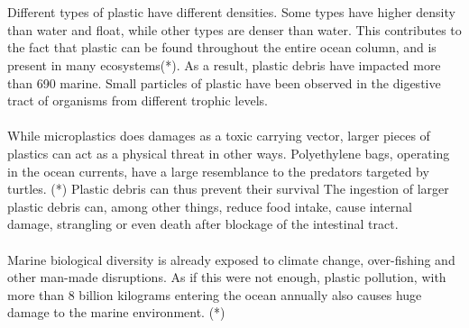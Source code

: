 \\\\
Different types of plastic have different densities. Some types have higher density than water and float, while other types are denser than water. This contributes to the fact that plastic can be found throughout the entire ocean column, and is present in many ecosystems(*). As a result, plastic debris have impacted more than 690 marine. Small particles of plastic have been observed in the digestive tract of organisms from different trophic levels. 
\\\\
While microplastics does damages as a toxic carrying vector, larger pieces of plastics can act as a physical threat in other ways. Polyethylene bags, operating in the ocean currents, have a large resemblance to the predators targeted by turtles. (*) Plastic debris can thus prevent their survival %
The ingestion of larger plastic debris can, among other things, reduce food intake, cause internal damage, strangling or even death after blockage of the intestinal tract. %
\\\\
Marine biological diversity is already exposed to climate change, over-fishing and other man-made disruptions. As if this were not enough, plastic pollution, with more than 8 billion kilograms entering the ocean annually
also causes huge damage to the marine environment. (*)

